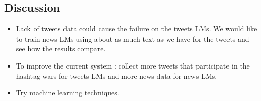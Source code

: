 \documentclass[a0,portrait]{a0poster}
\begin{document}
\begin{multicols}{2}
\section*{\LARGE Discussion}

\begin{itemize}
\item Lack of tweets data could cause the failure on the tweets LMs. We would like to train news LMs using about as much text as we have for the tweets and see how the results compare.
\item To improve the current system : collect more tweets that participate in the hashtag wars for tweets LMs and more news data for news LMs. 
\item Try machine learning techniques.
\end{itemize}




\nocite{*} %
\small  %





\end{multicols}
\end{document}
